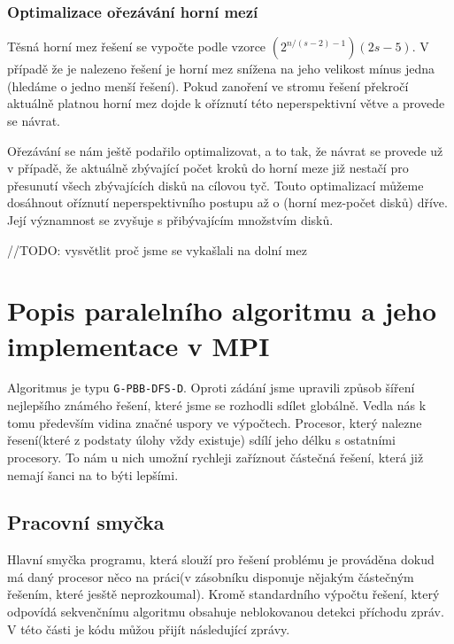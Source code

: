 \documentclass[12pt]{article}
\begin{document}
\subsubsection{Optimalizace ořezávání horní mezí}
Těsná horní mez řešení se vypočte podle vzorce $(2^{n/(s-2)-1})(2s-5)$. V případě že je nalezeno řešení je horní mez snížena na jeho velikost mínus jedna (hledáme o jedno menší řešení). Pokud zanoření ve stromu řešení překročí aktuálně platnou horní mez dojde k oříznutí této neperspektivní větve a provede se návrat. 

Ořezávání se nám ještě podařilo optimalizovat, a to tak, že návrat se provede už v případě, že aktuálně zbývající počet kroků do horní meze již nestačí pro přesunutí všech zbývajících disků na cílovou tyč. Touto optimalizací můžeme dosáhnout oříznutí neperspektivního postupu až o (horní mez-počet disků) dříve. Její významnost se zvyšuje s přibývajícím množstvím disků.



//TODO: vysvětlit proč jsme se vykašlali na dolní mez

\section{Popis paralelního algoritmu a jeho implementace v MPI}
Algoritmus je typu \verb|G-PBB-DFS-D|. Oproti zádání jsme upravili způsob
šíření nejlepšího známého řešení, které jsme se rozhodli sdílet globálně. Vedla
nás k tomu především vidina značné uspory ve výpočtech. Procesor, který nalezne
řesení(které z podstaty úlohy vždy existuje) sdílí jeho délku s ostatními
procesory. To nám u nich umožní rychleji zaříznout částečná řešení, která již
nemají šanci na to býti lepšími.

\subsection{Pracovní smyčka}
Hlavní smyčka programu, která slouží pro řešení problému je prováděna dokud má
daný procesor něco na práci(v zásobníku disponuje nějakým částečným řešením,
které jesště neprozkoumal). Kromě standardního výpočtu řešení, který odpovídá
sekvenčnímu algoritmu obsahuje neblokovanou detekci příchodu zpráv. V této
části je kódu můžou přijít následující zprávy.
\end{document}

